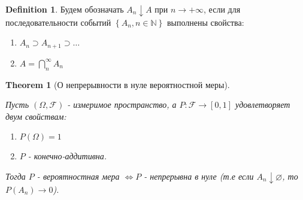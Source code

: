 \documentclass[a4paper]{article}
\theoremstyle{plain}
\newtheorem{theorem}{Theorem}
\theoremstyle{remark}
\theoremstyle{definition}
\newtheorem{definition}{Definition}
\newcommand{\setN}{\mathbb{N}}
\newcommand{\setF}{\mathcal{F}}
\newcommand{\braces}[1]{\left\{ #1 \right\}} %
\renewcommand{\emptyset}{\varnothing}
\begin{document}
\begin{definition}
	Будем обозначать $A_n \downarrow A$ при $n \to +\infty $, если для последовательности событий $\braces{A_n, n \in \setN}$ выполнены свойства: 

	\begin{enumerate}
		\item $A_n \supset A_{n+1} \supset \ldots$
		\item $A = \bigcap\limits_{n}^{\infty} A_n$
	\end{enumerate}
\end{definition}

\begin{theorem}[О непрерывности в нуле вероятностной меры]~

	Пусть $(\Omega, \setF)$ - измеримое пространство, а $P\colon \setF \rightarrow [0, 1]$ удовлетворяет двум свойствам:
	\begin{enumerate}
		\item $P(\Omega) = 1$
		\item $P$ - конечно-аддитивна. 
	\end{enumerate}
	Тогда $P$ - вероятностная мера $\iff P$ - непрерывна в нуле (т.е если $A_n  \downarrow \emptyset$, то $P(A_n) \to 0$).

\end{theorem}
\end{document}
